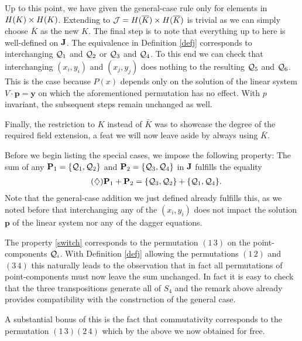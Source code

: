 \documentclass[english,11pt,a4paper]{article}
\begin{document}
\begin{remark}
  Up to this point, we have given the general-case rule only for elements in $H(K) \times H(K)$. Extending to $\mathcal{J} = H(\overline K) \times H(\overline K)$ is trivial as we can simply choose $\bar K$ as the new $K$. The final step is to note that everything up to here is well-defined on $\mathbf{J}$. The equivalence in Definition \ref{defj} corresponds to interchanging $\mathcal{Q}_1$ and $\mathcal{Q}_2$ or $\mathcal{Q}_3$ and $\mathcal{Q}_4$.
  To this end we can check that interchanging $(x_i,y_i)$ and $(x_j,y_j)$ does nothing to the resulting $\mathcal{Q}_5$ and $\mathcal{Q}_6$. This is the case because $P(x)$ depends only on the solution of the linear system $V \cdot \mathbf{p} = \mathbf{y}$ on which the aforementioned permutation has no effect. With $p$ invariant, the subsequent steps remain unchanged as well.

  Finally, the restriction to $K$ instead of $\bar K$ was to showcase the degree of the required field extension, a feat we will now leave aside by always using $\bar K$.
\end{remark}



Before we begin listing the special cases, we impose the following property: The sum of any $\mathbf{P}_1 = \{\mathcal{Q}_1,\mathcal{Q}_2\}$ and $\mathbf{P}_2 = \{\mathcal{Q}_3,\mathcal{Q}_4\}$ in $\mathbf{J}$ fulfills the equality
\begin{align*}
  \tag{$\diamondsuit$} \label{switch} \mathbf{P}_1 + \mathbf{P}_2 &= \{\mathcal{Q}_3,\mathcal{Q}_2\} + \{\mathcal{Q}_1,\mathcal{Q}_4\}.
\end{align*}
Note that the general-case addition we just defined already fulfills this, as we noted before that interchanging any of the $(x_i, y_i)$ does not impact the solution $\mathbf{p}$ of the linear system nor any of the dagger equations.

\begin{remark}\label{permut}
  The property \eqref{switch} corresponds to the permutation $(1 \, 3)$ on the point-components $\mathcal{Q}_i$. With Definition \ref{defj} allowing the permutations $(1 \, 2)$ and $(3 \, 4)$ this naturally leads to the observation that in fact all permutations of point-components must now leave the sum unchanged. In fact it is easy to check that the three transpositions generate all of $S_4$ and the remark above already provides compatibility with the construction of the general case.

  A substantial bonus of this is the fact that commutativity corresponds to the permutation $(1 \, 3)(2 \, 4)$ which by the above we now obtained for free.
\end{remark}
\end{document}
